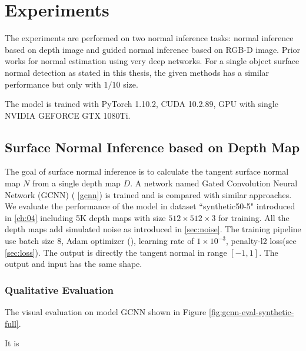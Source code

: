 
\chapter{Experiments} %

\label{ch:05} %
The experiments are performed on two normal inference tasks: normal inference based on depth image and guided normal inference based on RGB-D image. Prior works for normal estimation using very deep networks. For a single object surface normal detection as stated in this thesis, the given methods has a similar performance but only with $ 1/10 $ size.

The model is trained with PyTorch 1.10.2, CUDA 10.2.89, GPU with single NVIDIA GEFORCE GTX 1080Ti.


\section{Surface Normal Inference based on Depth Map}
The goal of surface normal inference is to calculate the tangent surface normal map $ N $ from a single depth map $ D $. A network named Gated Convolution Neural Network (GCNN) ( \ref{gcnn}) is trained and is compared with similar approaches. We evaluate the performance of the model in dataset ``synthetic50-5" introduced in  \ref{ch:04} including 5K depth maps with size  $ 512\times512\times3 $ for training. All the depth maps add simulated noise as introduced in \ref{sec:noise}. The training pipeline use batch size $ 8 $,  Adam optimizer (\cite{adam}), learning rate of  $ 1\times10^{-3} $, penalty-l2 loss(see \ref{sec:loss}). The output is directly the tangent normal in range $ \left[-1,1\right] $. The output and input has the same shape. 

\subsection{Qualitative Evaluation}

The visual evaluation on model GCNN shown in Figure \ref{fig:gcnn-eval-synthetic-full}. 

It is 

